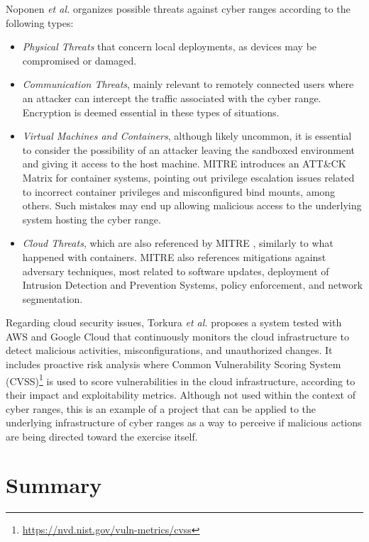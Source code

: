 Noponen \textit{et al.} \cite{cybersecurity_threat_and_mitigations_ref} organizes possible threats against cyber ranges according to the following types:

\begin{itemize}
    \item \textit{Physical Threats} that concern local deployments, as devices may be compromised or damaged.
    \item \textit{Communication Threats}, mainly relevant to remotely connected users where an attacker can intercept the traffic associated with the cyber range. Encryption is deemed essential in these types of situations.
    \item \textit{Virtual Machines and Containers}, although likely uncommon, it is essential to consider the possibility of an attacker leaving the sandboxed environment and giving it access to the host machine. MITRE \cite{mitre_containers_issues_ref} introduces an ATT\&CK Matrix for container systems, pointing out privilege escalation issues related to incorrect container privileges and misconfigured bind mounts, among others. Such mistakes may end up allowing malicious access to the underlying system hosting the cyber range.
    \item \textit{Cloud Threats}, which are also referenced by MITRE \cite{mitre_cloud_issues_ref}, similarly to what happened with containers. MITRE also references mitigations against adversary techniques, most related to software updates, deployment of Intrusion Detection and Prevention Systems, policy enforcement, and network segmentation.
\end{itemize}

Regarding cloud security issues, Torkura \textit{et al.} \cite{continuous_auditing_and_threat_detection_ref} proposes a system tested with AWS and Google Cloud that continuously monitors the cloud infrastructure to detect malicious activities, misconfigurations, and unauthorized changes. It includes proactive risk analysis where Common Vulnerability Scoring System (CVSS)\footnote{\url{https://nvd.nist.gov/vuln-metrics/cvss}} is used to score vulnerabilities in the cloud infrastructure, according to their impact and exploitability metrics. Although not used within the context of cyber ranges, this is an example of a project that can be applied to the underlying infrastructure of cyber ranges as a way to perceive if malicious actions are being directed toward the exercise itself.

\section{Summary} \label{sec:summary}

